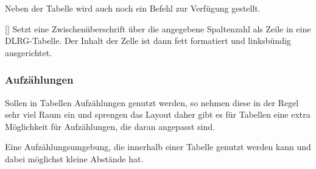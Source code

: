 \documentclass[
    a4paper,
    12pt,
    parskip=half,
]{scrartcl}
\begin{document}
    Neben der Tabelle wird auch noch ein Befehl zur Verfügung gestellt.
    \begin{commands}
        []
            Setzt eine Zwischenüberschrift über die angegebene Spaltenzahl als Zeile in eine DLRG-Tabelle. Der Inhalt der Zelle ist dann fett formatiert und linksbündig ausgerichtet.
    \end{commands}

    \subsubsection{Aufzählungen}
    Sollen in Tabellen Aufzählungen genutzt werden, so nehmen diese in der Regel sehr viel Raum ein und sprengen das Layout daher gibt es für Tabellen eine extra Möglichkeit für Aufzählungen, die daran angepasst sind.

    \begin{environments}
            Eine Aufzählungsumgebung, die innerhalb einer Tabelle genutzt werden kann und dabei möglichst kleine Abstände hat.
    \end{environments}
\end{document}
